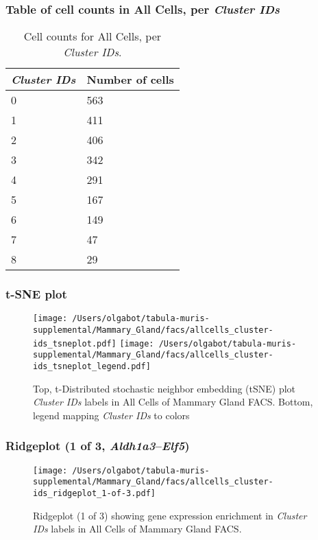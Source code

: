 \subsubsection{Table of cell counts in All Cells, per \emph{Cluster IDs}}\begin{table}[h]
\centering
\label{my-label}
\begin{tabular}{@{}ll@{}}
\toprule

\emph{Cluster IDs}& Number of cells \\ \midrule
0 & 563 \\

1 & 411 \\

2 & 406 \\

3 & 342 \\

4 & 291 \\

5 & 167 \\

6 & 149 \\

7 & 47 \\

8 & 29 \\
\bottomrule
\end{tabular}
\caption{Cell counts for All Cells, per \emph{Cluster IDs}.}
\end{table}

\clearpage
\subsubsection{t-SNE plot}
\begin{figure}[h]
\centering
\texttt{[image: /Users/olgabot/tabula-muris-supplemental/Mammary\_Gland/facs/allcells\_cluster-ids\_tsneplot.pdf]}
\texttt{[image: /Users/olgabot/tabula-muris-supplemental/Mammary\_Gland/facs/allcells\_cluster-ids\_tsneplot\_legend.pdf]}
\caption{Top, t-Distributed stochastic neighbor embedding (tSNE) plot  \emph{Cluster IDs} labels in All Cells of Mammary Gland FACS. Bottom, legend mapping \emph{Cluster IDs} to colors}
\end{figure}


\clearpage

\subsubsection{Ridgeplot (1 of 3, \emph{Aldh1a3}--\emph{Elf5})}
\begin{figure}[h]
\centering
\texttt{[image: /Users/olgabot/tabula-muris-supplemental/Mammary\_Gland/facs/allcells\_cluster-ids\_ridgeplot\_1-of-3.pdf]}

\caption{ Ridgeplot (1 of 3)  showing gene expression enrichment in \emph{Cluster IDs} labels in All Cells of Mammary Gland FACS. }
\end{figure}


